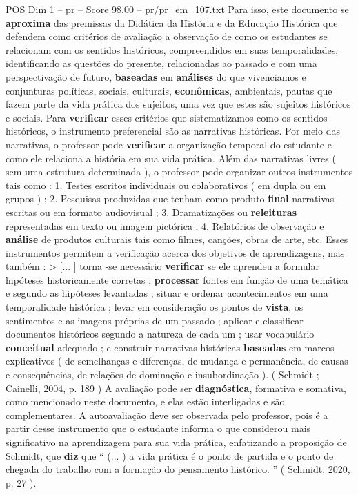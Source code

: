 \begin{textsample}{POS Dim 1 – pr – Score 98.00 – pr/pr\_em\_107.txt}
Para isso, este documento se \textbf{aproxima} das premissas da Didática da História e da Educação Histórica que defendem como critérios de avaliação a observação de como os estudantes se relacionam com os sentidos históricos, compreendidos em suas temporalidades, identificando as questões do presente, relacionadas ao passado e com uma perspectivação de futuro, \textbf{baseadas} em \textbf{análises} do que vivenciamos e conjunturas políticas, sociais, culturais, \textbf{econômicas}, ambientais, pautas que fazem parte da vida prática dos sujeitos, uma vez que estes são sujeitos históricos e sociais.
Para \textbf{verificar} esses critérios que sistematizamos como os sentidos históricos, o instrumento preferencial são as narrativas históricas.
Por meio das narrativas, o professor pode \textbf{verificar} a organização temporal do estudante e como ele relaciona a história em sua vida prática.
Além das narrativas livres ( sem uma estrutura determinada ), o professor pode organizar outros instrumentos tais como : 1.
Testes escritos individuais ou colaborativos ( em dupla ou em grupos ) ; 2.
Pesquisas produzidas que tenham como produto \textbf{final} narrativas escritas ou em formato audiovisual ; 3.
Dramatizações ou \textbf{releituras} representadas em texto ou imagem pictórica ; 4.
Relatórios de observação e \textbf{análise} de produtos culturais tais como filmes, canções, obras de arte, etc.
Esses instrumentos permitem a verificação acerca dos objetivos de aprendizagens, mas também : > [... ] torna -se necessário \textbf{verificar} se ele aprendeu a formular hipóteses historicamente corretas ; \textbf{processar} fontes em função de uma temática e segundo as hipóteses levantadas ; situar e ordenar acontecimentos em uma temporalidade histórica ; levar em consideração os pontos de \textbf{vista}, os sentimentos e as imagens próprias de um passado ; aplicar e classificar documentos históricos segundo a natureza de cada um ; usar vocabulário \textbf{conceitual} adequado ; e construir narrativas históricas \textbf{baseadas} em marcos explicativos ( de semelhanças e diferenças, de mudança e permanência, de causas e consequências, de relações de dominação e insubordinação ). ( Schmidt ; Cainelli, 2004, p. 189 ) A avaliação pode ser \textbf{diagnóstica}, formativa e somativa, como mencionado neste documento, e elas estão interligadas e são complementares.
A autoavaliação deve ser observada pelo professor, pois é a partir desse instrumento que o estudante informa o que considerou mais significativo na aprendizagem para sua vida prática, enfatizando a proposição de Schmidt, que \textbf{diz} que “ (... ) a vida prática é o ponto de partida e o ponto de chegada do trabalho com a formação do pensamento histórico. ” ( Schmidt, 2020, p. 27 ).

\end{textsample}
